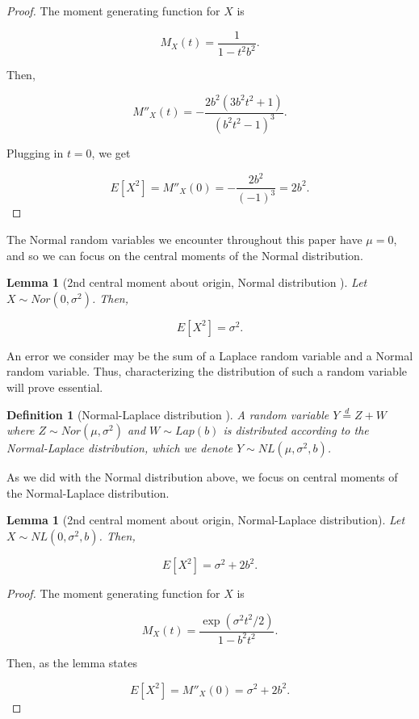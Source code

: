 \documentclass{article}
\theoremstyle{plain}
\newtheorem{lem}[thm]{Lemma}
\newtheorem{defn}[thm]{Definition}
\begin{document}
\begin{proof}
The moment generating function for $X$ is 

$$M_X(t) = \frac{1}{1 - t^2b^2}.$$

Then,

$$M''_X(t) = -\frac{2b^2(3b^2t^2 + 1)}{(b^2t^2 - 1)^3}.$$

Plugging in $t = 0$, we get 

$$E[X^2] = M''_X(0) = -\frac{2b^2}{(-1)^3} = 2b^2.$$
\end{proof}

The Normal random variables we encounter throughout this paper have $\mu = 0$, and so we can focus on the central moments of the Normal distribution.

\begin{lem}[2nd central moment about origin, Normal distribution \cite{papoulis2002probability}]
Let $X \sim Nor(0, \sigma^2)$. Then,

$$E[X^2] = \sigma^2.$$
\end{lem}

An error we consider may be the sum of a Laplace random variable and a Normal random variable. Thus, characterizing the distribution of such a random variable will prove essential.

\begin{defn}[Normal-Laplace distribution \cite{Reed2006}]
A random variable $Y \overset{d}{=} Z + W$ where $Z \sim Nor(\mu, \sigma^2)$ and $W \sim Lap(b)$ is distributed according to the Normal-Laplace distribution, which we denote $Y \sim NL(\mu, \sigma^2, b)$.
\end{defn}

As we did with the Normal distribution above, we focus on central moments of the Normal-Laplace distribution.

\begin{lem}[2nd central moment about origin, Normal-Laplace distribution]
\label{nl_secmom}
Let $X \sim NL(0, \sigma^2, b)$. Then, 

$$E[X^2] = \sigma^2 + 2b^2.$$
\end{lem}

\begin{proof}
The moment generating function for $X$ is

$$M_X(t) = \frac{\exp(\sigma^2t^2/2)}{1 - b^2t^2}.$$

Then, as the lemma states

$$E[X^2] = M''_X(0) = \sigma^2 + 2b^2.$$
\end{proof}
\end{document}
